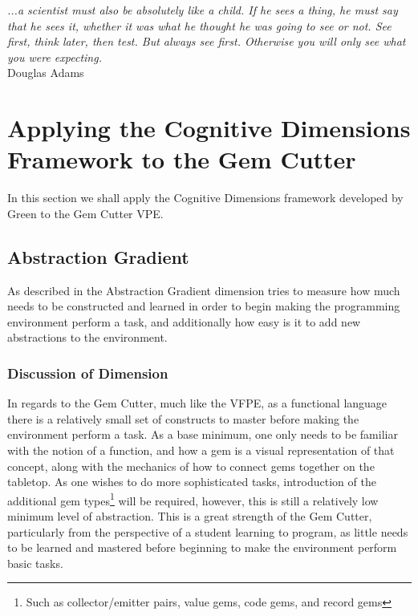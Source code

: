 \label{chapter:Exp}

\begin{flushright}
\textit{...a scientist must also be absolutely like a child.  If he sees a thing, he must say that he sees it, whether it was what he thought he was going to see or not.  See first, think later, then test.  But always see first.  Otherwise you will only see what you were expecting.}
\\
Douglas Adams \cite{Adams84} \\
\end{flushright}

\section{Applying the Cognitive Dimensions Framework to the Gem Cutter}

In this section we shall apply the Cognitive Dimensions framework developed by Green to the Gem Cutter VPE.

\subsection{Abstraction Gradient}

As described in  the Abstraction Gradient dimension tries to measure how much needs to be constructed
and learned in order to begin making the programming environment perform a task, and additionally how easy is it to add new abstractions to the environment.

\subsubsection{Discussion of Dimension}

In regards to the Gem Cutter, much like the VFPE, as a functional language there is a relatively small set of constructs to master before making the environment perform a task.  As a base minimum, one only needs to be familiar with the notion of a function, and how a gem is a visual representation of that concept, along with the mechanics of how to connect gems together on the tabletop.  As one wishes to do more sophisticated tasks, introduction of the additional gem types\footnote{Such as collector/emitter pairs, value gems, code gems, and record gems} will be required, however, this is still a relatively low minimum level of abstraction.  This is a great strength of the Gem Cutter, particularly from the perspective of a student learning to program, as little needs to be learned and mastered before beginning to make the environment perform basic tasks.


